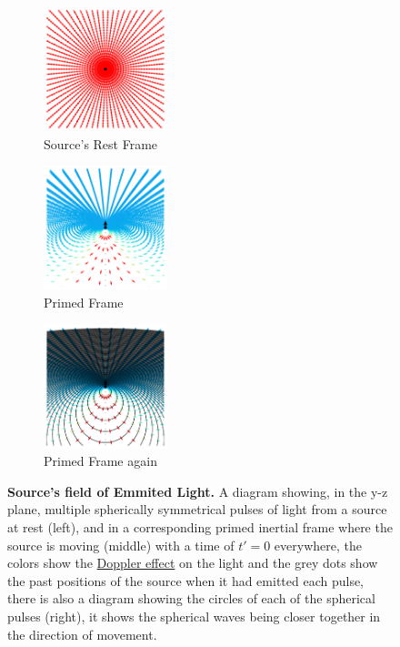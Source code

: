 \begin{figure}[H]
	\centering
	\begin{subfigure}{.3\textwidth}
		\centering
		\includegraphics[width = 3.6cm]{images/pdf/Field_Rest_Frame.pdf}
		\caption{Source's Rest Frame}
	\end{subfigure}
	\begin{subfigure}{.3\textwidth}
		\centering
		\includegraphics[width = 3.6cm]{images/pdf/Field_Moving_Frame_Doppler.pdf}
		\caption{Primed Frame}
	\end{subfigure}
	\begin{subfigure}{.3\textwidth}
		\centering
		\includegraphics[width = 3.6cm]{images/pdf/Field_Moving_Frame_Doppler_circles.pdf}
		\caption{Primed Frame again}
	\end{subfigure}
	\caption{\textbf{Source's field of Emmited Light.} A diagram showing, in the y-z plane, multiple spherically symmetrical pulses of light from a source at rest (left), and in a corresponding primed inertial frame where the source is moving (middle) with a time of $t'=0$ everywhere, the colors show the \protect\hyperlink{def-doppler-effect}{Doppler effect} on the light and the grey dots show the past positions of the source when it had emitted each pulse, there is also a diagram showing the circles of each of the spherical pulses (right), it shows the spherical waves being closer together in the direction of movement.}
	\label{fig: full field transformation}
\end{figure}


